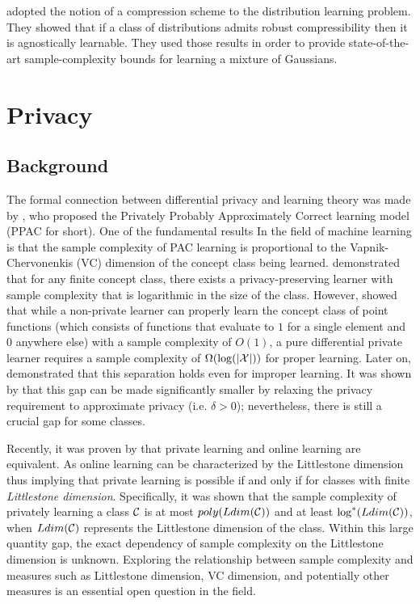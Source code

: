 \documentclass[12pt,a4paper,oneside,onecolumn]{book}
\begin{document}
\citet{ashtiani2020near} adopted the notion of a compression scheme
to the distribution learning problem.
They showed
that if a class of distributions admits
robust compressibility
then
it is agnostically learnable.
They used those results in order to provide state-of-the-art
sample-complexity bounds for learning a mixture of Gaussians.

\section{Privacy}
\subsection{Background}
The formal connection between differential privacy and learning theory was made by \citet{KLNRS08}, who proposed the Privately Probably Approximately Correct learning model (PPAC for short). 
One of the fundamental results In the field of machine learning is that the sample complexity of PAC learning is proportional to the Vapnik-Chervonenkis (VC) dimension of the concept class being learned. 
\citeauthor{KLNRS08} demonstrated that for any finite concept class, there exists a privacy-preserving learner with sample complexity that is logarithmic in the size of the class. 
However, \citet{beimel2010bounds} showed that while a non-private learner can properly learn the concept class of point functions (which consists of functions that evaluate to $1$ for a single element and $0$ anywhere else) with a sample complexity of $O(1)$, a pure differential private learner requires a sample complexity of $\Omega(\log(|\mathcal{X}|))$ for proper learning. 
Later on, \citet{FeldmanX15} demonstrated that this separation holds even for improper learning. It was shown by \citet{BNS13b} that this gap can be made significantly smaller by relaxing the privacy requirement to approximate privacy (i.e. $\delta >0$); nevertheless, there is still a crucial gap for some classes.

Recently, it was proven by \cite{AlonLMM19, BunLM20, DBLP:journals/corr/abs-2106-13513} that private learning and online learning are equivalent. As online learning can be characterized by the Littlestone dimension \citep{littlestone1988learning, ben2009agnostic} thus implying that private learning is possible if and only if for classes with finite \emph{Littlestone dimension}. Specifically, it was shown that the sample complexity of privately learning a class $\mathcal{C}$ is at most $poly(Ldim(\mathcal{C}))$ 
and at least $\log^*(Ldim(\mathcal{C}))$, 
when $Ldim(\mathcal{C})$ represents the Littlestone dimension of the class. 
Within this large quantity gap, the exact dependency of sample complexity on the Littlestone dimension is unknown.
Exploring the relationship between sample complexity and measures such as Littlestone dimension, VC dimension, and potentially other measures is an essential open question in the field.
%
%
\end{document}
